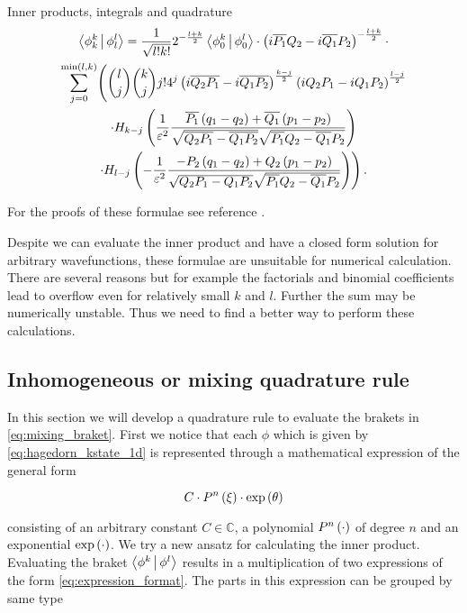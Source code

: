 \begin{chapter}{Inner products, integrals and quadrature}
\begin{multline} \label{eq:mixing_braket}
  \Braket{ \phi_k^k | \phi_l^l } =
  \frac{1}{\sqrt{l!k!}} 2^{-\frac{l+k}{2}} \Braket{ \phi_0^k | \phi_0^l } \cdot
  \left(i \overline{ P_1} Q_2 - i \overline{Q_1} P_2\right)^{-\frac{l+k}{2}} \cdot \\
  \sum_{j=0}^{\min\left(l,k\right)}
    \Biggl(
      \binom{l}{j} \binom{k}{j} j! 4^j \left(i \overline{Q_2 P_1}-i\overline{Q_1 P_2}\right)^{\frac{k-j}{2}}
      \left(i Q_2  P_1 - i Q_1  P_2\right)^{\frac{l-j}{2}}
      \\
      \cdot H_{k-j}\left(\frac{1}{\varepsilon^2}
                   \frac{\overline{ P_1}\left(q_1-q_2\right)+\overline{Q_1}\left(p_1-p_2\right)}
                        {\sqrt{\overline{Q_2 P_1}-\overline{Q_1 P_2}}\sqrt{\overline{ P_1}Q_2-\overline{Q_1} P_2}}\right)
      \\
      \cdot H_{l-j}\left(-\frac{1}{\varepsilon^2}
                    \frac{-P_2\left(q_1-q_2\right)+Q_2\left(p_1-p_2\right)}
                         {\sqrt{Q_2 P_1 - Q_1 P_2}\sqrt{\overline{P_1}Q_2-\overline{Q_1} P_2}}\right)
    \Biggr) \,.
\end{multline}

For the proofs of these formulae see reference \cite{H_R_quantization_rules}.

Despite we can evaluate the inner product and have a closed form solution for arbitrary
wavefunctions, these formulae are unsuitable for numerical calculation. There are
several reasons but for example the factorials and binomial coefficients lead to
overflow even for relatively small $k$ and $l$. Further the sum may be numerically
unstable. Thus we need to find a better way to perform these calculations.


\subsection{Inhomogeneous or mixing quadrature rule}
\label{sec:mixing_quadrature}

In this section we will develop a quadrature rule to evaluate the brakets in \eqref{eq:mixing_braket}.
First we notice that each $\phi$ which is given by \eqref{eq:hagedorn_kstate_1d}
is represented through a mathematical expression of the general form

\begin{equation} \label{eq:expression_format}
  C \cdot P^n\left( \xi \right) \cdot \exp \left( \theta \right)
\end{equation}

consisting of an arbitrary constant $C \in \mathbb{C}$, a polynomial $P^n\left( \cdot \right)$
of degree $n$ and an exponential $\exp\left( \cdot \right)$. We try a new ansatz for calculating
the inner product. Evaluating the braket $\Braket{\phi^k | \phi^l}$ results in a
multiplication of two expressions of the form \eqref{eq:expression_format}. The
parts in this expression can be grouped by same type


\end{chapter}

